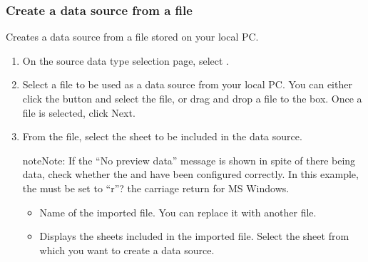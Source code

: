 \documentclass[letterpaper,10pt,english]{sphinxmanual}
\begin{document}
\subsubsection{Create a data source from a file}
\label{\detokenize{discovery/part02/create_a_data_source:create-datasource-from-file}}\label{\detokenize{discovery/part02/create_a_data_source:id2}}
Creates a data source from a file stored on your local PC.
\begin{enumerate}
\def\theenumi{\arabic{enumi}}
\def\labelenumi{\theenumi .}
\makeatletter\def\p@enumii{\p@enumi \theenumi .}\makeatother
\item {} 
On the source data type selection page, select .

\item {} 
Select a file to be used as a data source from your local PC. You can either click the  button and select the file, or drag and drop a file to the box. Once a file is selected, click Next.

\begin{figure}[H]
\centering

\noindent{}
\end{figure}

\item {} 
From the file, select the sheet to be included in the data source.

\begin{sphinxadmonition}{note}{Note:}
If the “No preview data” message is shown in spite of there being data, check whether the  and  have been configured correctly. In this example, the  must be set to “r”? the carriage return for MS Windows.
\end{sphinxadmonition}

\begin{figure}[H]
\centering

\noindent{}
\end{figure}
\begin{itemize}
\item {} 
 Name of the imported file. You can replace it with another file.

\item {} 
 Displays the sheets included in the imported file. Select the sheet from which you want to create a data source.


\end{itemize}
\end{enumerate}
\end{document}
